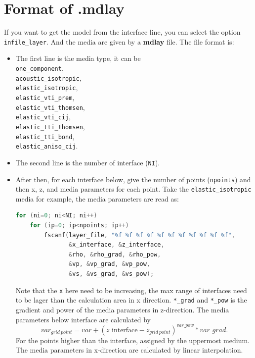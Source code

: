 \section{Format of .mdlay} \label{mdlay}

If you want to get the model from the interface line, you can select the option \texttt{infile\_layer}.
And the media are given by a \textbf{mdlay} file. The file format is:
\begin{itemize}
 \item The first line is the media type, it can be \\
 \texttt{one\_component}, \\ 
 \texttt{acoustic\_isotropic}, \\
 \texttt{elastic\_isotropic}, \\
 \texttt{elastic\_vti\_prem}, \\
 \texttt{elastic\_vti\_thomsen}, \\ 
 \texttt{elastic\_vti\_cij}, \\
 \texttt{elastic\_tti\_thomsen}, \\ 
 \texttt{elastic\_tti\_bond}, \\
 \texttt{elastic\_aniso\_cij}.

 \item The second line is the number of interface (\texttt{NI}).

 \item After then, for each interface below, give the number of points (\texttt{npoints}) and then x, z, and media parameters for each point. Take the \texttt{elastic\_isotropic} media for example, the media parameters are read as:
 \begin{lstlisting}[language=C]
  for (ni=0; ni<NI; ni++) 
    for (ip=0; ip<npoints; ip++) 
        fscanf(layer_file, "%f %f %f %f %f %f %f %f %f %f %f", 
               &x_interface, &z_interface,
               &rho, &rho_grad, &rho_pow,
               &vp, &vp_grad, &vp_pow,
               &vs, &vs_grad, &vs_pow);
 \end{lstlisting}
 Note that the \texttt{x} here need to be increasing, the max range of interfaces need to be lager than the calculation area in x direction. 
 \texttt{*\_grad} and \texttt{*\_pow} is the gradient and power of the media parameters in z-direction. The media parameters below interface are calculated by
 \begin{equation*}
    var_{grid~point} = var + \left( z\text{\_interface}-z_{grid~point} \right)^{var\_pow} * var\_grad.
 \end{equation*}
For the points higher than the interface, assigned by the uppermost medium. The media parameters in x-direction are calculated by linear interpolation.


\end{itemize}
